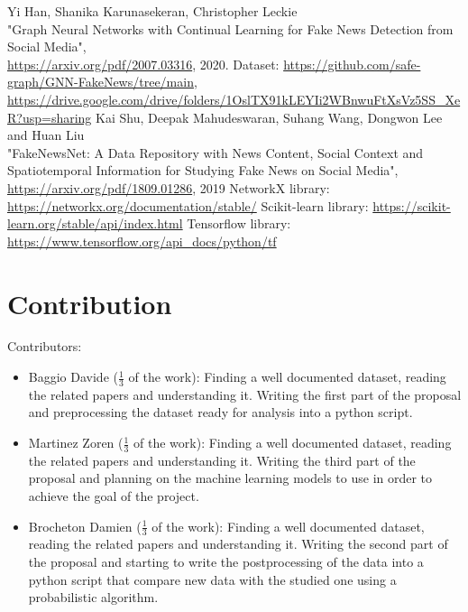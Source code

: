 \documentclass[11pt,a4paper]{article}
\begin{document}
\begin{thebibliography}{9}
	 Yi Han, Shanika Karunasekeran, Christopher Leckie\\"Graph Neural Networks with Continual Learning for Fake News Detection from Social Media",\\ \url{https://arxiv.org/pdf/2007.03316}, 2020.
	 Dataset: \url{https://github.com/safe-graph/GNN-FakeNews/tree/main},\\\url{https://drive.google.com/drive/folders/1OslTX91kLEYIi2WBnwuFtXsVz5SS_XeR?usp=sharing}
	 Kai Shu, Deepak Mahudeswaran, Suhang Wang, Dongwon Lee and Huan Liu\\"FakeNewsNet: A Data Repository with News Content, Social Context and Spatiotemporal Information for Studying Fake News on Social Media",\\ \url{https://arxiv.org/pdf/1809.01286}, 2019
	 NetworkX library: \url{https://networkx.org/documentation/stable/}
	 Scikit-learn library: \url{https://scikit-learn.org/stable/api/index.html}
	 Tensorflow library: \url{https://www.tensorflow.org/api_docs/python/tf}
\end{thebibliography}

\newpage

\section*{Contribution}
Contributors:
\begin{itemize}
	\setlength\itemsep{-0.3em}
	\item Baggio Davide ($\frac{1}{3}$ of the work): Finding a well documented dataset, reading the related papers and understanding it. Writing the first part of the proposal and preprocessing the dataset ready for analysis into a python script.
	\item Martinez Zoren ($\frac{1}{3}$ of the work): Finding a well documented dataset,  reading the related papers and understanding it. Writing the third part of the proposal and planning on the machine learning models to use in order to achieve the goal of the project.
	\item Brocheton Damien ($\frac{1}{3}$ of the work): Finding a well documented dataset,  reading the related papers and understanding it. Writing the second part of the proposal and starting to write the postprocessing of the data into a python script that compare new data with the studied one using a probabilistic algorithm.
\end{itemize}
\end{document}
